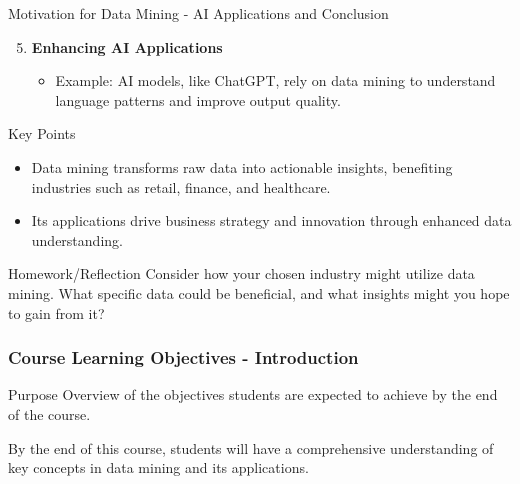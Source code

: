 \documentclass[aspectratio=169]{beamer}
\begin{document}
\begin{frame}[fragile]{Motivation for Data Mining - AI Applications and Conclusion}
    \begin{enumerate}
        \setcounter{enumi}{4}
        \item \textbf{Enhancing AI Applications}
            \begin{itemize}
                \item Example: AI models, like ChatGPT, rely on data mining to understand language patterns and improve output quality.
            \end{itemize}
    \end{enumerate}

    \begin{block}{Key Points}
        \begin{itemize}
            \item Data mining transforms raw data into actionable insights, benefiting industries such as retail, finance, and healthcare.
            \item Its applications drive business strategy and innovation through enhanced data understanding.
        \end{itemize}
    \end{block}

    \begin{block}{Homework/Reflection}
        Consider how your chosen industry might utilize data mining. What specific data could be beneficial, and what insights might you hope to gain from it?
    \end{block}
\end{frame}

\begin{frame}[fragile]
    \frametitle{Course Learning Objectives - Introduction}
    \begin{block}{Purpose}
        Overview of the objectives students are expected to achieve by the end of the course.
    \end{block}
    By the end of this course, students will have a comprehensive understanding of key concepts in data mining and its applications.
\end{frame}
\end{document}
